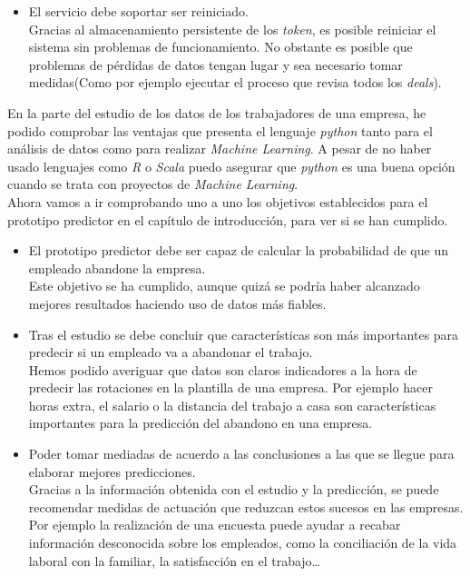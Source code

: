 \begin{itemize}
	\item El servicio debe soportar ser reiniciado.\\
	
	Gracias al almacenamiento persistente de los \textit{token}, es posible reiniciar el sistema sin problemas de funcionamiento. No obstante es posible que problemas de pérdidas de datos tengan lugar y sea necesario tomar medidas(Como por ejemplo ejecutar el proceso que revisa todos los \textit{deals}).

\end{itemize}	

En la parte del estudio de los datos de los trabajadores de una empresa, he podido comprobar las ventajas que presenta el lenguaje \textit{python} tanto para el análisis de datos como para realizar \textit{Machine Learning}.
A pesar de no haber usado lenguajes como \textit{R} o \textit{Scala} puedo asegurar que \textit{python} es una buena opción cuando se trata con proyectos de \textit{Machine Learning}.\\

Ahora vamos a ir comprobando uno a uno los objetivos establecidos para el prototipo predictor en el capítulo de introducción, para ver si se han cumplido.

\begin{itemize}
	
	\item El prototipo predictor debe ser capaz de calcular la probabilidad de que un empleado abandone la empresa.\\
	
	Este objetivo se ha cumplido, aunque quizá se podría haber alcanzado mejores resultados haciendo uso de datos más fiables.
	\item Tras el estudio se debe concluir que características son más importantes para predecir si un empleado va a abandonar el trabajo.\\
	
	Hemos podido averiguar que datos son claros indicadores a la hora de predecir las rotaciones en la plantilla de una empresa. Por ejemplo hacer horas extra, el salario o la distancia del trabajo a casa son características importantes para la predicción del abandono en una empresa.
	
	\item Poder tomar mediadas de acuerdo a las conclusiones a las que se llegue para elaborar mejores predicciones.\\
	
	Gracias a la información obtenida con el estudio y la predicción, se puede recomendar medidas de actuación que reduzcan estos sucesos en las empresas. Por ejemplo la realización de una encuesta puede ayudar a recabar información desconocida sobre los empleados, como la conciliación de la vida laboral con la familiar, la satisfacción en el trabajo\ldots\\
	
	
\end{itemize}




